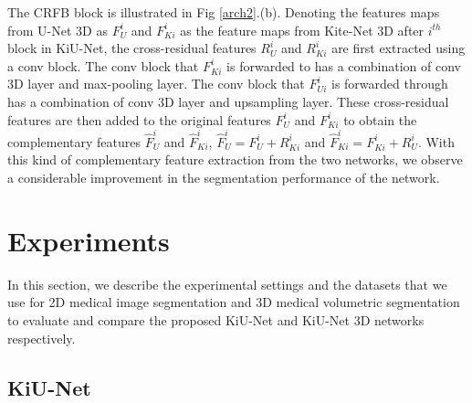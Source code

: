 \documentclass[journal,twoside,web]{ieeecolor}
\begin{document}
The CRFB block is illustrated in Fig \ref{arch2}.(b). Denoting  the features maps from U-Net 3D as $F_{U}^i$ and  $F_{Ki}^i$ as the feature maps from Kite-Net 3D after $i^{th}$ block in KiU-Net,  the cross-residual features $R_U^i$ and $R_{Ki}^i$ are first extracted using a conv block. The conv block that $F_{Ki}^i$ is forwarded to has a combination of conv 3D layer and max-pooling layer. The conv block that $F_{Ui}^i$ is forwarded through has a combination of conv 3D layer and upsampling layer.  These cross-residual features are then added to the original features $F_{U}^i$ and  $F_{Ki}^i$   to obtain the complementary features $\hat{F}_{U}^i$ and  $\hat{F}_{Ki}^i$,  $\hat{F}_{U}^i = F_{U}^i + R_{Ki}^i$ and $\hat{F}_{Ki}^i = F_{Ki}^i + R_{U}^i$. With this kind of complementary feature extraction from the two networks, we observe a considerable improvement in the segmentation performance of the network.   






\section{Experiments}

In this section,  we describe the experimental settings and the datasets  that we use for 2D medical image segmentation and  3D medical volumetric segmentation   to evaluate and compare the proposed  KiU-Net and KiU-Net 3D networks respectively. 

\subsection{KiU-Net}
\end{document}
